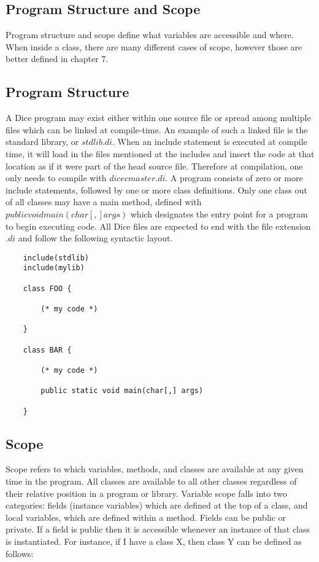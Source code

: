 \begin{homeworkProblem}
	\chapter{Program Structure and Scope}
	
	Program structure and scope define what variables are accessible and where. When inside a class, there are many different cases of scope, however those are better defined in chapter 7. 
	
	\section{Program Structure}
		
	A Dice program may exist either within one source file or spread among multiple files which can be linked at compile-time. An example of such a linked file is the standard library, or $stdlib.di$. When an include statement is executed at compile time, it will load in the files mentioned at the includes and insert the code at that location as if it were part of the head source file. Therefore at compilation, one only needs to compile with $dicec master.di$. A program consists of zero or more include statements, followed by one or more class definitions. Only one class out of all classes may have a main method, defined with $public void main(char[,] args)$ which designates the entry point for a program to begin executing code. All Dice files are expected to end with the file extension $.di$ and follow the following syntactic layout. 
	
	\begin{verbatim}
	include(stdlib)
	include(mylib)
	
	class FOO {
	
		(* my code *)
	
	}
	
	class BAR {
	
		(* my code *)
		
		public static void main(char[,] args)
	
	}
	\end{verbatim}

	
	\section{Scope}
		
		
	Scope refers to which variables, methods, and classes are available at any given time in the program. All classes are available to all other classes regardless of their relative position in a program or library. Variable scope falls into two categories: fields (instance variables) which are defined at the top of a class, and local variables, which are defined within a method. Fields can be public or private. If a field is public then it is accessible whenever an instance of that class is instantiated. For instance, if I have a class X, then class Y can be defined as follows:
	

\end{homeworkProblem}
